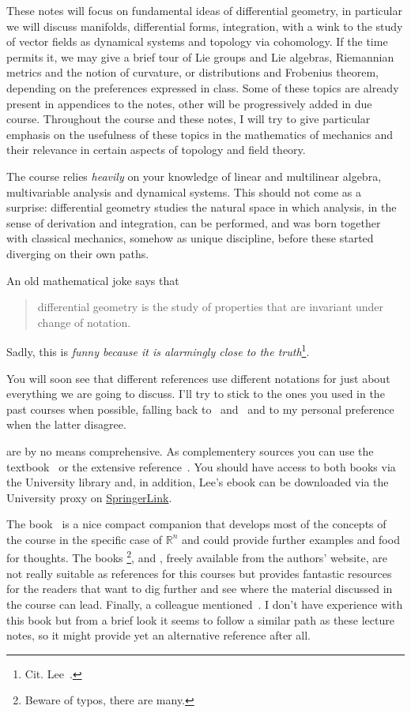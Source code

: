 \documentclass[nobib, a4paper]{tufte-book}
\theoremstyle{plain}
\theoremstyle{definition}
\theoremstyle{remark}
\newcommand{\R}{\mathbb{R}}
\begin{document}
These notes will focus on fundamental ideas of differential geometry, in particular we will discuss manifolds, differential forms, integration, with a wink to the study of vector fields as dynamical systems and topology via cohomology.
If the time permits it, we may give a brief tour of Lie groups and Lie algebras, Riemannian metrics and the notion of curvature, or distributions and Frobenius theorem, depending on the preferences expressed in class.
Some of these topics are already present in appendices to the notes, other will be progressively added in due course.
Throughout the course and these notes, I will try to give particular emphasis on the usefulness of these topics in the mathematics of mechanics and their relevance in certain aspects of topology and field theory.

The course relies \emph{heavily} on your knowledge of linear and multilinear algebra, multivariable analysis and dynamical systems. 
This should not come as a surprise: differential geometry studies the natural space in which analysis, in the sense of derivation and integration, can be performed, and was born together with classical mechanics, somehow as unique discipline, before these started diverging on their own paths.

An old mathematical joke says that
\begin{quote}
  differential geometry is the study of properties that are invariant under change of notation.
\end{quote}
Sadly, this is \emph{funny because it is alarmingly close to the truth}\footnote{Cit. Lee~\cite{book:lee}.}.

You will soon see that different references use different notations for just about everything we are going to discuss.
I'll try to stick to the ones you used in the past courses when possible, falling back to~\cite{book:lee} and~\cite{book:tu} and to my personal preference when the latter disagree.

 are by no means comprehensive.
As complementery sources you can use the textbook~\cite{book:tu} or the extensive reference~\cite{book:lee}.
You should have access to both books via the University library and, in addition, Lee's ebook can be downloaded via the University proxy on \href{https://link.springer.com/book/10.1007/978-1-4419-9982-5}{SpringerLink}.

The book~\cite{book:McInerney} is a nice compact companion that develops most of the concepts of the course in the specific case of $\R^n$ and could provide further examples and food for thoughts.
The books \cite{book:nicolaescu}\footnote{Beware of typos, there are many.}, \cite{book:crane} and \cite{lectures:nanda}, freely available from the authors' website, are not really suitable as references for this courses but provides fantastic resources for the readers that want to dig further and see where the material discussed in the course can lead.
Finally, a colleague mentioned~\cite{book:lang}. I don't have experience with this book but from a brief look it seems to follow a similar path as these lecture notes, so it might provide yet an alternative reference after all.
\end{document}
